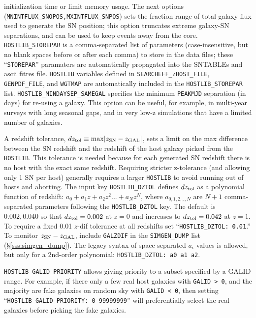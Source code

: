\documentclass[12pt]{article}
\begin{document}
{initialization time or limit memory usage.
The next options ({\tt MNINTFLUX\_SNOPOS,MXINTFLUX\_SNPOS}) sets the
fraction range of total galaxy flux used to generate the
SN position; this option truncates extreme galaxy-SN
separations, and can be used to keep events away from the core.
{\tt HOSTLIB\_STOREPAR} is a comma-separated
list of parameters (case-insensitive, but no blank spaces
before or after each comma) to store in the data files;
these ``{\tt STOREPAR}'' paramaters are automatically propagated 
into the SNTABLEs  and ascii fitres file.
{\tt HOSTLIB} variables defined in 
{\tt SEARCHEFF\_zHOST\_FILE},
{\tt GENPDF\_FILE}, and
{\tt WGTMAP}
are automatically included in the {\tt HOSTLIB\_STOREPAR} list.
%
{\tt HOSTLIB\_MINDAYSEP\_SAMEGAL} specifies the minimum
{\tt PEAKMJD} separation (in days) for re-using a galaxy.
This option can be useful, for example, in multi-year surveys 
with long seasonal gaps, and in very low-z simulations that have 
a limited number of galaxies.


\newcommand{\dztol}{dz_{\rm tol}}
A redshift tolerance, 
$\dztol \equiv {\rm max}|z_{\rm SN} - z_{\rm GAL}|$,
sets a limit on the max difference between the SN redshift
and the redshift of the host galaxy picked from the {\tt HOSTLIB}.
This tolerance is needed because for each generated SN redshift there 
is no host with the exact same redshift. Requiring stricter
z-tolerance (and allowing only 1 SN per host) generally
requires a larger {\tt HOSTLIB} to avoid running out of
hosts and aborting. The input key {\tt HOSTLIB\_DZTOL}
defines $\dztol$ as a polynomial function of redshift:
$a_0 + a_1z + a_2z^2 ... + a_Nz^N$, 
where $a_{0,1,2,,,N}$ are $N+1$ comma-separated parameters
following the {\tt HOSTLIB\_DZTOL} key.
The default is $0.002,0.040$ so that
$\dztol=  0.002$ at $z=0$ and increases to $\dztol= 0.042$ at $z=1$.
To require a fixed 0.01 $z$-dif tolerance at all redshifts set
``{\tt HOSTLIB\_DZTOL: 0.01}.''
To monitor $z_{\rm SN} - z_{\rm GAL}$,
include {\tt GALZDIF} in the {\tt SIMGEN\_DUMP} list
(\S\ref{sss:simgen_dump}).
The legacy syntax of space-separated $a_i$ values is allowed,
but only for a 2nd-order polynomial: 
{\tt HOSTLIB\_DZTOL: a0 a1 a2}.

{\tt HOSTLIB\_GALID\_PRIORITY} allows giving priority to a
subset specified by a GALID range. For example, if there only
a few real host galaxies with {\tt GALID > 0}, 
and the majority are fake galaxies on random sky
with {\tt GALID < 0}, then setting 
``{\tt HOSTLIB\_GALID\_PRIORITY: 0 99999999}''  will preferentially
select the real galaxies before picking the fake galaxies.

}
\end{document}
